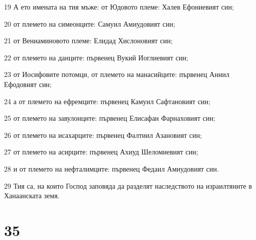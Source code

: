\par 19 А ето имената на тия мъже: от Юдовото племе: Халев Ефониевият син;
\par 20 от племето на симеонците: Самуил Амиудовият син;
\par 21 от Вениаминовото племе: Елидад Хислоновият син;
\par 22 от племето на данците: първенец Вукий Иоглиевият син;
\par 23 от Иосифовите потомци, от племето на манасийците: първенец Аниил Ефодовият син;
\par 24 а от племето на ефремците: първенец Камуил Сафтановият син;
\par 25 от племето на завулонците: първенец Елисафан Фарнаховият син;
\par 26 от племето на исахарците: първенец Фалтиил Азановият син;
\par 27 от племето на асирците: първенец Ахиуд Шеломиевият син;
\par 28 и от племето на нефталимците: първенец Федаил Амиудовият син.
\par 29 Тия са, на които Господ заповяда да разделят наследството на израилтяните в Ханаанската земя.

\chapter{35}

